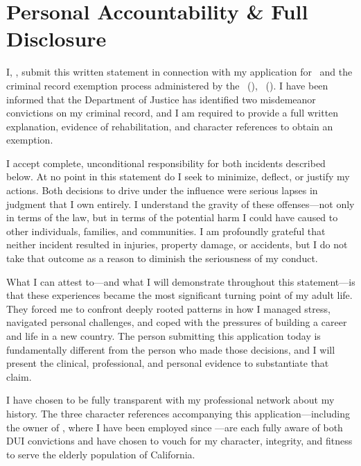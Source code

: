 

\statementmeta

\section{Personal Accountability \& Full Disclosure}

I, \ApplicantName, submit this written statement in connection with my application for \CertificationType\ and the criminal record exemption process administered by the \AgencyFull\ (\AgencyAbbrev), \BranchFull\ (\BranchAbbrev). I have been informed that the Department of Justice has identified two misdemeanor convictions on my criminal record, and I am required to provide a full written explanation, evidence of rehabilitation, and character references to obtain an exemption.

I accept complete, unconditional responsibility for both incidents described below. At no point in this statement do I seek to minimize, deflect, or justify my actions. Both decisions to drive under the influence were serious lapses in judgment that I own entirely. I understand the gravity of these offenses---not only in terms of the law, but in terms of the potential harm I could have caused to other individuals, families, and communities. I am profoundly grateful that neither incident resulted in injuries, property damage, or accidents, but I do not take that outcome as a reason to diminish the seriousness of my conduct.

What I can attest to---and what I will demonstrate throughout this statement---is that these experiences became the most significant turning point of my adult life. They forced me to confront deeply rooted patterns in how I managed stress, navigated personal challenges, and coped with the pressures of building a career and life in a new country. The person submitting this application today is fundamentally different from the person who made those decisions, and I will present the clinical, professional, and personal evidence to substantiate that claim.

I have chosen to be fully transparent with my professional network about my history. The three character references accompanying this application---including the owner of \EmployerName, where I have been employed since \EmployerSince---are each fully aware of both DUI convictions and have chosen to vouch for my character, integrity, and fitness to serve the elderly population of California.

